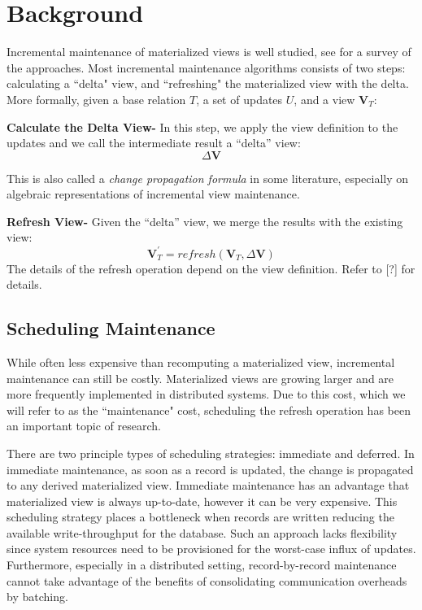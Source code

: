 \section{Background}
Incremental maintenance of materialized views is well studied, see \cite{chirkova2011materialized} for a survey of the approaches. 
Most incremental maintenance algorithms consists of two steps: calculating a ``delta" view,
and ``refreshing" the materialized view with the delta.
More formally, given a base relation $T$, a set of updates $U$,
and a view $\textbf{V}_{T}$:

\textbf{Calculate the Delta View- }
In this step, we apply the view definition to the updates and we call
the intermediate result a ``delta'' view:
\[
\Delta\textbf{V}
\]

This is also called a \emph{change propagation formula} in some literature,
especially on algebraic representations of incremental view maintenance.

\textbf{Refresh View- }
Given the ``delta'' view, we merge the results with the existing
view:
\[
\textbf{V}_{T}^{'}=refresh(\textbf{V}_{T},\Delta\textbf{V})
\] 
The details of the refresh operation depend on the view definition.
Refer to [?] for details.


\subsection{Scheduling Maintenance}
While often less expensive than recomputing a materialized view,
incremental maintenance can still be costly.
Materialized views are growing larger and are more frequently 
implemented in distributed systems.
Due to this cost, which we will refer to as the ``maintenance" cost, 
scheduling the refresh operation has been an important topic of research.

There are two principle types of scheduling strategies: immediate and deferred. 
In immediate maintenance, as soon as a record is updated, 
the change is propagated to any derived materialized view.
Immediate maintenance has an advantage that materialized view is always up-to-date, 
however it can be very expensive.
This scheduling strategy places a bottleneck when records are written reducing 
the available write-throughput for the database.
Such an approach lacks flexibility since system resources need to be provisioned 
for the worst-case influx of updates.
Furthermore, especially in a distributed setting, record-by-record 
maintenance cannot take advantage of the benefits of consolidating communication overheads by batching.

